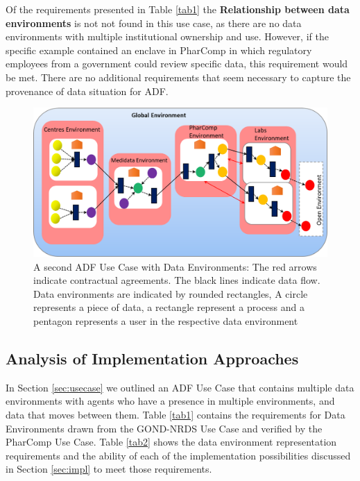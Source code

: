 Of the requirements presented in Table \ref{tab1} the \textbf{Relationship between data environments} is not not found in this use case, as there are no data environments with multiple institutional ownership and use. However, if the specific example contained an enclave in PharComp in which regulatory employees from a government could review specific data, this requirement would be met. There are no additional requirements that seem necessary to capture the provenance of data situation for ADF.
\begin{figure}
    \centering
    \includegraphics[width=\textwidth]{UseCase2.png}
    \caption{A second ADF Use Case with Data Environments: The red arrows indicate contractual agreements. The black lines indicate data flow. Data environments are indicated by rounded rectangles, A circle represents a piece of data, a rectangle represent a process and a pentagon represents a user in the respective data environment}
    \label{fig:usecase2}
\end{figure}
\subsection{Analysis of Implementation Approaches}
 In Section \ref{sec:usecase} we outlined an ADF Use Case that contains multiple data environments with agents who have a presence in multiple environments, and data that moves between them. Table \ref{tab1} contains the requirements for Data Environments drawn from the GOND-NRDS Use Case and verified by the PharComp Use Case. Table \ref{tab2} shows the data environment representation requirements and the ability of each of the implementation possibilities discussed in Section \ref{sec:impl} to meet those requirements. 

